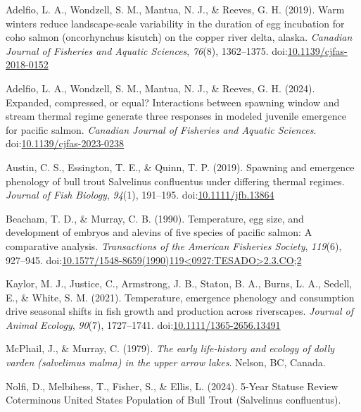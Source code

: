 \documentclass[10pt,a4paper,onecolumn]{article}
\newlength{\cslhangindent}
\newenvironment{CSLReferences}[2] %
 {\begin{list}{}{%
  \setlength{\itemindent}{0pt}
  \setlength{\leftmargin}{0pt}
  \setlength{\parsep}{0pt}
  \ifodd #1
   \setlength{\leftmargin}{\cslhangindent}
   \setlength{\itemindent}{-1\cslhangindent}
  \fi
  \setlength{\itemsep}{#2\baselineskip}}}
 {\end{list}}
\begin{document}
\label{refs}
\begin{CSLReferences}{1}{0}
Adelfio, L. A., Wondzell, S. M., Mantua, N. J., \& Reeves, G. H. (2019).
Warm winters reduce landscape-scale variability in the duration of egg
incubation for coho salmon (oncorhynchus kisutch) on the copper river
delta, alaska. \emph{Canadian Journal of Fisheries and Aquatic
Sciences}, \emph{76}(8), 1362--1375.
doi:\href{https://doi.org/10.1139/cjfas-2018-0152}{10.1139/cjfas-2018-0152}

Adelfio, L. A., Wondzell, S. M., Mantua, N. J., \& Reeves, G. H. (2024).
Expanded, compressed, or equal? Interactions between spawning window and
stream thermal regime generate three responses in modeled juvenile
emergence for pacific salmon. \emph{Canadian Journal of Fisheries and
Aquatic Sciences}.
doi:\href{https://doi.org/10.1139/cjfas-2023-0238}{10.1139/cjfas-2023-0238}

Austin, C. S., Essington, T. E., \& Quinn, T. P. (2019). Spawning and
emergence phenology of bull trout Salvelinus confluentus under differing
thermal regimes. \emph{Journal of Fish Biology}, \emph{94}(1), 191--195.
doi:\href{https://doi.org/10.1111/jfb.13864}{10.1111/jfb.13864}

Beacham, T. D., \& Murray, C. B. (1990). Temperature, egg size, and
development of embryos and alevins of five species of pacific salmon: A
comparative analysis. \emph{Transactions of the American Fisheries
Society}, \emph{119}(6), 927--945.
doi:\href{https://doi.org/10.1577/1548-8659(1990)119\%3C0927:TESADO\%3E2.3.CO;2}{10.1577/1548-8659(1990)119\textless0927:TESADO\textgreater2.3.CO;2}

Kaylor, M. J., Justice, C., Armstrong, J. B., Staton, B. A., Burns, L.
A., Sedell, E., \& White, S. M. (2021). Temperature, emergence phenology
and consumption drive seasonal shifts in fish growth and production
across riverscapes. \emph{Journal of Animal Ecology}, \emph{90}(7),
1727--1741.
doi:\href{https://doi.org/10.1111/1365-2656.13491}{10.1111/1365-2656.13491}

McPhail, J., \& Murray, C. (1979). \emph{The early life-history and
ecology of dolly varden (salvelimus malma) in the upper arrow lakes}.
Nelson, BC, Canada.

Nolfi, D., Melbihess, T., Fisher, S., \& Ellis, L. (2024). 5-Year
Statuse Review Coterminous United States Population of Bull Trout
(Salvelinus confluentus).


\end{CSLReferences}
\end{document}
